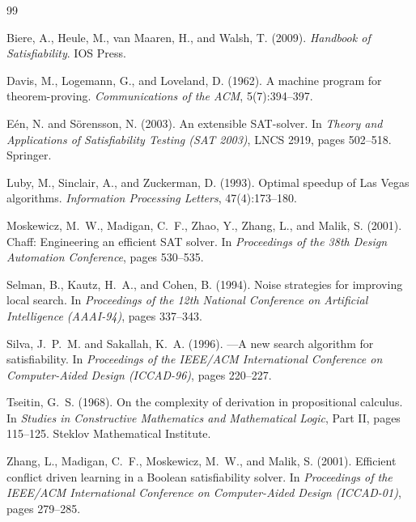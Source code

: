 \documentclass[11pt,a4paper]{article}
\begin{document}
\begin{thebibliography}{99}

Biere, A., Heule, M., van Maaren, H., and Walsh, T. (2009).
\newblock \emph{Handbook of Satisfiability}.
\newblock IOS Press.

Davis, M., Logemann, G., and Loveland, D. (1962).
\newblock A machine program for theorem-proving.
\newblock \emph{Communications of the ACM}, 5(7):394--397.

E{\'e}n, N. and S{\"o}rensson, N. (2003).
\newblock An extensible SAT-solver.
\newblock In \emph{Theory and Applications of Satisfiability Testing (SAT 2003)}, LNCS 2919, pages 502--518. Springer.

Luby, M., Sinclair, A., and Zuckerman, D. (1993).
\newblock Optimal speedup of {L}as {V}egas algorithms.
\newblock \emph{Information Processing Letters}, 47(4):173--180.

Moskewicz, M.~W., Madigan, C.~F., Zhao, Y., Zhang, L., and Malik, S. (2001).
\newblock Chaff: Engineering an efficient SAT solver.
\newblock In \emph{Proceedings of the 38th Design Automation Conference}, pages 530--535.

Selman, B., Kautz, H.~A., and Cohen, B. (1994).
\newblock Noise strategies for improving local search.
\newblock In \emph{Proceedings of the 12th National Conference on Artificial Intelligence (AAAI-94)}, pages 337--343.

Silva, J.~P.~M. and Sakallah, K.~A. (1996).
---A new search algorithm for satisfiability.
\newblock In \emph{Proceedings of the IEEE/ACM International Conference on Computer-Aided Design (ICCAD-96)}, pages 220--227.

Tseitin, G.~S. (1968).
\newblock On the complexity of derivation in propositional calculus.
\newblock In \emph{Studies in Constructive Mathematics and Mathematical Logic}, Part II, pages 115--125. Steklov Mathematical Institute.

Zhang, L., Madigan, C.~F., Moskewicz, M.~W., and Malik, S. (2001).
\newblock Efficient conflict driven learning in a Boolean satisfiability solver.
\newblock In \emph{Proceedings of the IEEE/ACM International Conference on Computer-Aided Design (ICCAD-01)}, pages 279--285.

\end{thebibliography}
\end{document}
